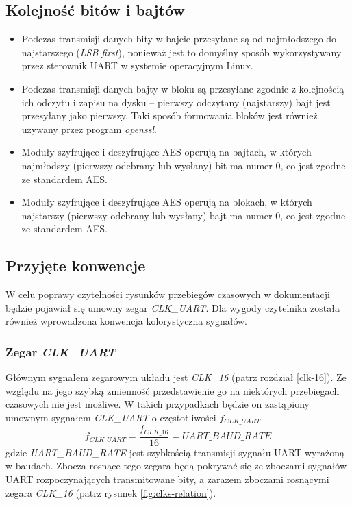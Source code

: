 \subsection{Kolejność bitów i bajtów}
\begin{itemize}
\item Podczas transmisji danych bity w bajcie przesyłane są od najmłodszego do najstarszego (\textit{LSB first}), ponieważ jest to domyślny sposób wykorzystywany przez sterownik UART w systemie operacyjnym Linux.
\item Podczas transmisji danych bajty w bloku są przesyłane zgodnie z kolejnością ich odczytu i zapisu na dysku -- pierwszy odczytany (najstarszy) bajt jest przesyłany jako pierwszy. Taki sposób formowania bloków jest również używany przez program \textit{openssl}.
\item Moduły szyfrujące i deszyfrujące AES operują na bajtach, w których najmłodszy (pierwszy odebrany lub wysłany) bit ma numer 0, co jest zgodne ze standardem AES.
\item Moduły szyfrujące i deszyfrujące AES operują na blokach, w których najstarszy (pierwszy odebrany lub wysłany) bajt ma numer 0, co jest zgodne ze standardem AES.
\end{itemize}

\subsection{Przyjęte konwencje}

W celu poprawy czytelności rysunków przebiegów czasowych w dokumentacji będzie pojawiał się umowny zegar \textit{CLK\_UART}. Dla wygody czytelnika została również wprowadzona konwencja kolorystyczna sygnałów.

\subsubsection{Zegar \textit{CLK\_UART}}
Głównym sygnałem zegarowym układu jest \textit{CLK\_16} (patrz rozdział \ref{clk-16}). Ze względu na jego szybką zmienność przedstawienie go na niektórych przebiegach czasowych nie jest możliwe. W takich przypadkach będzie on zastąpiony umownym sygnałem \textit{CLK\_UART} o częstotliwości $f_{CLK\_UART}$.
\begin{equation*}
f_{CLK\_UART} = \frac{f_{CLK\_16}}{16} = UART\_BAUD\_RATE
\label{eq:clk-uart-freq}
\end{equation*}
gdzie \textit{UART\_BAUD\_RATE} jest szybkością transmisji sygnału UART wyrażoną w baudach. Zbocza rosnące tego zegara będą pokrywać się ze zboczami sygnałów UART rozpoczynających transmitowane bity, a zarazem zboczami rosnącymi zegara \textit{CLK\_16} (patrz rysunek \ref{fig:clks-relation}). 

